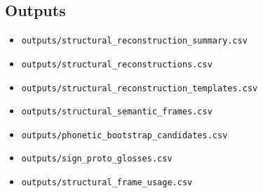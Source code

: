 \documentclass[11pt,a4paper]{article}
\begin{document}
\subsection*{Outputs}
\begin{itemize}
\item \texttt{outputs/structural\_reconstruction\_summary.csv}
\item \texttt{outputs/structural\_reconstructions.csv}
\item \texttt{outputs/structural\_reconstruction\_templates.csv}
\item \texttt{outputs/structural\_semantic\_frames.csv}
\item \texttt{outputs/phonetic\_bootstrap\_candidates.csv}
\item \texttt{outputs/sign\_proto\_glosses.csv}
\item \texttt{outputs/structural\_frame\_usage.csv}
\end{itemize}
\end{document}
